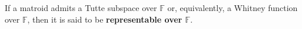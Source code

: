 If a matroid admits a Tutte subspace over $\mathbb{F}$ or, equivalently, a Whitney function over $\mathbb{F}$, then it is said to be \textbf{representable over $\mathbb{F}$}.
